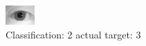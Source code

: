 \begin{figure}[h!]
\begin{center}
\includegraphics[width=0.60\columnwidth]{figures/ID1192_class_2_target_3.png}
\end{center}
\caption{ Classification: 2 actual target: 3}
\label{fig:ID1192_class_2_target_3}
\end{figure}
